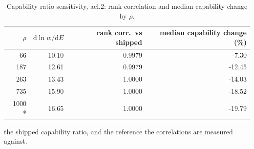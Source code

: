\begin{table}[htbp]
  \centering
  \caption{Capability ratio sensitivity, acl.2: rank correlation and median capability change by $\rho$.}
  \label{tab:rho-acl-2-summary}
  \begin{tabular}{r r r r}
    \toprule
    $\rho$ & $\mathrm{d}\ln w/\mathrm{d}E$ & rank corr.\ vs shipped & median capability change (\%) \\
    \midrule
    66 & 10.10 & 0.9979 & -7.30 \\
    187 & 12.61 & 0.9979 & -12.45 \\
    263 & 13.43 & 1.0000 & -14.03 \\
    735 & 15.90 & 1.0000 & -18.52 \\
    1000 * & 16.65 & 1.0000 & -19.79 \\
    \bottomrule
  \end{tabular}
  \par\smallskip\footnotesize * the shipped capability ratio, and the reference the correlations are measured against.
\end{table}
